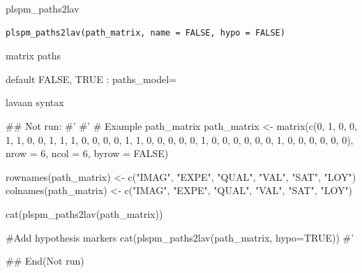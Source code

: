 \documentclass[a4paper]{book}
\begin{document}
%
\begin{Description}
plspm\_paths2lav
\end{Description}
%
\begin{Usage}
\begin{verbatim}
plspm_paths2lav(path_matrix, name = FALSE, hypo = FALSE)
\end{verbatim}
\end{Usage}
%
\begin{Arguments}
\begin{ldescription}
\item[\code{path\_matrix}] matrix paths

\item[\code{name}] default FALSE, TRUE : paths\_model=
\end{ldescription}
\end{Arguments}
%
\begin{Value}
lavaan syntax
\end{Value}
%
\begin{Examples}
\begin{ExampleCode}
\#\# Not run: 
#'
#' # Example path_matrix
path_matrix <- matrix(c(0, 1, 0, 0, 1, 1,
                        0, 0, 1, 1, 1, 0,
                        0, 0, 0, 1, 1, 0,
                        0, 0, 0, 0, 1, 0,
                        0, 0, 0, 0, 0, 1,
                        0, 0, 0, 0, 0, 0),
                      nrow = 6, ncol = 6, byrow = FALSE)

rownames(path_matrix) <- c("IMAG", "EXPE", "QUAL", "VAL", "SAT", "LOY")
colnames(path_matrix) <- c("IMAG", "EXPE", "QUAL", "VAL", "SAT", "LOY")

cat(plspm_paths2lav(path_matrix))

#Add hypothesis markers
cat(plspm_paths2lav(path_matrix, hypo=TRUE))
#'

## End(Not run)
\end{ExampleCode}
\end{Examples}
\end{document}
